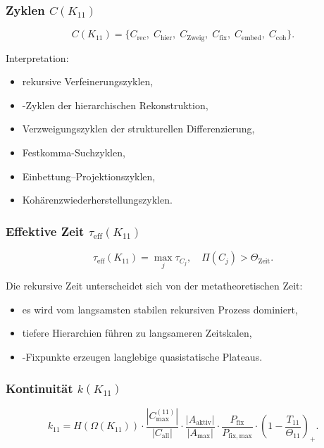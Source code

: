 \subsubsection{Zyklen $C(K_{11})$}

\[
C(K_{11})=
\{
C_{\mathrm{rec}},\;
C_{\mathrm{hier}},\;
C_{\mathrm{Zweig}},\;
C_{\mathrm{fix}},\;
C_{\mathrm{embed}},\;
C_{\mathrm{coh}}
\}.
\]

Interpretation:
\begin{itemize}
    \item rekursive Verfeinerungszyklen,
    \item-Zyklen der hierarchischen Rekonstruktion,
    \item Verzweigungszyklen der strukturellen Differenzierung,
    \item Festkomma-Suchzyklen,
    \item Einbettung–Projektionszyklen,
    \item Kohärenzwiederherstellungszyklen.
\end{itemize}

\subsubsection{Effektive Zeit $\tau_{\mathrm{eff}}(K_{11})$}

\[
\tau_{\mathrm{eff}}(K_{11})
=
\max_j \tau_{C_j},
\quad
\Pi(C_j)>\Theta_{\mathrm{Zeit}}.
\]

Die rekursive Zeit unterscheidet sich von der metatheoretischen Zeit:
\begin{itemize}
    \item es wird vom langsamsten stabilen rekursiven Prozess dominiert,
    \item tiefere Hierarchien führen zu langsameren Zeitskalen,
    \item-Fixpunkte erzeugen langlebige quasistatische Plateaus.
\end{itemize}

\subsubsection{Kontinuität $k(K_{11})$}

\[
k_{11}=
H(\Omega(K_{11}))
\cdot
\frac{|C_{\max}^{(11)}|}{|C_{\mathrm{all}}|}
\cdot
\frac{|A_{\mathrm{aktiv}}|}{|A_{\max}|}
\cdot
\frac{P_{\mathrm{fix}}}{P_{\mathrm{fix,max}}}
\cdot
\left(1-\frac{T_{11}}{\Theta_{11}}\right)_+.
\]


